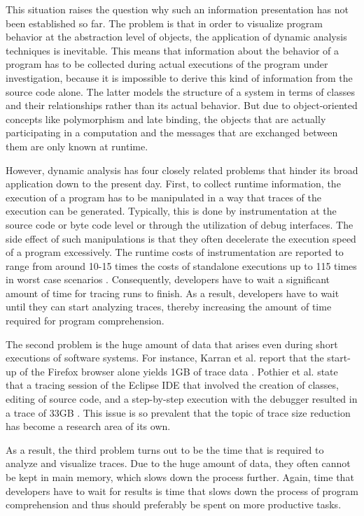This situation raises the question why such an information presentation has not been established so far.
The problem is that in order to visualize program behavior at the abstraction level of objects, the application of dynamic analysis techniques is inevitable.
This means that information about the behavior of a program has to be collected during actual executions of the program under investigation, because it is impossible to derive this kind of information from the source code alone.
The latter models the structure of a system in terms of classes and their relationships rather than its actual behavior.
But due to object-oriented concepts like polymorphism and late binding, the objects that are actually participating in a computation and the messages that are exchanged between them are only known at runtime.

However, dynamic analysis has four closely related problems that hinder its broad application down to the present day.
First, to collect runtime information, the execution of a program has to be manipulated in a way that traces of the execution can be generated.
Typically, this is done by instrumentation at the source code or byte code level or through the utilization of debug interfaces.
The side effect of such manipulations is that they often decelerate the execution speed of a program excessively.
The runtime costs of instrumentation are reported to range from around 10-15 times the costs of standalone executions up to 115 times in worst case scenarios \cite{pothier_scalable_2007, karran_synctrace:_2013}.
Consequently, developers have to wait a significant amount of time for tracing runs to finish.
As a result, developers have to wait until they can start analyzing traces, thereby increasing the amount of time required for program comprehension.

The second problem is the huge amount of data that arises even during short executions of software systems.
For instance, Karran et al. report that the start-up of the Firefox browser alone yields 1GB of trace data \cite{karran_extraction_2013}.
Pothier et al. state that a tracing session of the Eclipse IDE that involved the creation of classes, editing of source code, and a step-by-step execution with the debugger resulted in a trace of 33GB \cite{pothier_scalable_2007}.
This issue is so prevalent that the topic of trace size reduction has become a research area of its own.

As a result, the third problem turns out to be the time that is required to analyze and visualize traces.
Due to the huge amount of data, they often cannot be kept in main memory, which slows down the process further.
Again, time that developers have to wait for results is time that slows down the process of program comprehension and thus should preferably be spent on more productive tasks.

